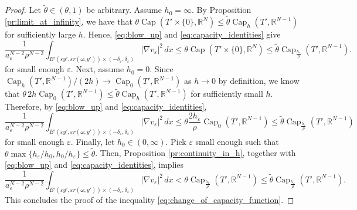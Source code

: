 \documentclass[10pt,a4paper]{amsart}
\newcommand{\cpct}{\operatorname{Cap}}
\begin{document}
\begin{proof}
    Let $\tilde{\theta} \in (\theta, 1)$  be arbitrary. Assume $h_0 = \infty$. By Proposition \ref{pr:limit_at_infinity}, we have that $\theta \cpct(T' \times \{0\}, \mathbb{R}^N) \le \tilde{\theta} \cpct_h(T', \mathbb{R}^{N - 1})$ for sufficiently large $h$. Hence, \eqref{eq:blow_up} and \eqref{eq:capacity_identities} give
    \begin{equation*}
        \frac{1}{a_\varepsilon^{N - 2} \rho^{N - 2}} \int_{B'(\varepsilon y', \varepsilon r(\omega, y')) \times (-\delta_\varepsilon, \delta_\varepsilon)} |\nabla v_\varepsilon|^2 \, dx \le \theta \cpct(T' \times \{0\}, \mathbb{R}^N) \le \tilde{\theta} \cpct_{\frac{h_\varepsilon}{\rho}}(T', \mathbb{R}^{N - 1}).
    \end{equation*}
    for small enough $\varepsilon$. Next, assume $h_0 = 0$. Since $\cpct_h(T', \mathbb{R}^{N - 1})/(2h) \to \cpct_0(T', \mathbb{R}^{N - 1})$ as $h \to 0$ by definition, we know that $\theta \, 2h \cpct_0(T', \mathbb{R}^{N - 1}) \le \tilde{\theta} \cpct_h(T', \mathbb{R}^{N - 1})$ for sufficiently small $h$. Therefore, by \eqref{eq:blow_up} and \eqref{eq:capacity_identities},
    \begin{equation*}
        \frac{1}{a_\varepsilon^{N - 2} \rho^{N - 2}} \int_{B'(\varepsilon y', \varepsilon r(\omega, y')) \times (-\delta_\varepsilon, \delta_\varepsilon)} |\nabla v_\varepsilon|^2 \, dx \le \theta \frac{2h_\varepsilon}{\rho} \cpct_0(T', \mathbb{R}^{N - 1}) \le \tilde{\theta} \cpct_{\frac{h_\varepsilon}{\rho}}(T', \mathbb{R}^{N - 1})
    \end{equation*}
    for small enough $\varepsilon$. Finally, let $h_0 \in (0, \infty)$. Pick $\varepsilon$ small enough such that $\theta \max \{h_\varepsilon/h_0, h_0/h_\varepsilon\} \le \tilde{\theta}$. Then, Proposition \ref{pr:continuity_in_h}, together with \eqref{eq:blow_up} and \eqref{eq:capacity_identities}, implies
    \begin{equation*}
        \frac{1}{a_\varepsilon^{N - 2} \rho^{N - 2}} \int_{B'(\varepsilon y', \varepsilon r(\omega, y')) \times (-\delta_\varepsilon, \delta_\varepsilon)} |\nabla v_\varepsilon|^2 \, dx < \theta \cpct_{\frac{h_0}{\rho}}(T', \mathbb{R}^{N - 1}) \le \tilde{\theta} \cpct_\frac{h_\varepsilon}{\rho}(T', \mathbb{R}^{N - 1}).
    \end{equation*}
    This concludes the proof of the inequality \eqref{eq:change_of_capacity_function}.
\end{proof}
\end{document}
